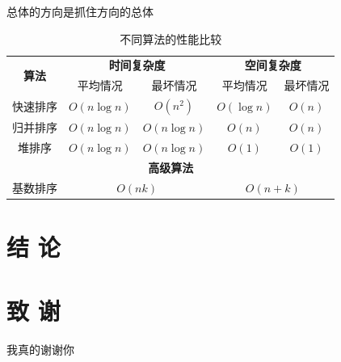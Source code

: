 \documentclass[12pt,a4paper,AutoFakeBold]{article}
\begin{document}
{总体的方向是抓住方向的总体

\begin{table}[htbp]
	\centering
	\caption{不同算法的性能比较}
	\begin{tabular}{|c|c|c|c|c|}
	  \hline
	  \multirow{2}{*}{\textbf{算法}} & \multicolumn{2}{c|}{\textbf{时间复杂度}} & \multicolumn{2}{c|}{\textbf{空间复杂度}} \\
	  \cline{2-5}
	  & 平均情况 & 最坏情况 & 平均情况 & 最坏情况 \\
	  \hline
	  快速排序 & $O(n\log n)$ & $O(n^2)$ & $O(\log n)$ & $O(n)$ \\
	  \hline
	  归并排序 & $O(n\log n)$ & $O(n\log n)$ & $O(n)$ & $O(n)$ \\
	  \hline
	  堆排序 & $O(n\log n)$ & $O(n\log n)$ & $O(1)$ & $O(1)$ \\
	  \hline
	  \multicolumn{5}{|c|}{\textbf{高级算法}} \\
	  \hline
	  基数排序 & \multicolumn{2}{c|}{$O(nk)$} & \multicolumn{2}{c|}{$O(n+k)$} \\
	  \hline
	\end{tabular}
	\label{tab:algorithm_comparison}
\end{table}


\newpage
{}
\section*{结 \quad 论}
\setcounter{结论编号}{\value{section}} %
\addtocounter{结论编号}{1}


\newpage
{}
\section*{致 \quad 谢}
我真的谢谢你
\par
\vspace{5ex}
\newpage
}



\renewcommand\refname{参考文献}
\label{sec:references}
{}

\end{document}
